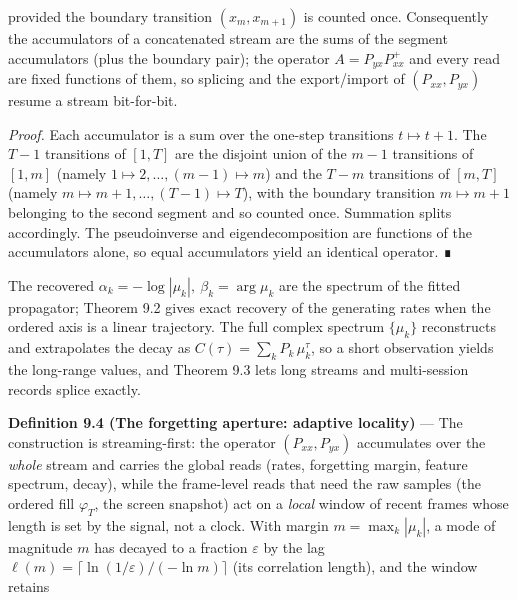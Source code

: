 \documentclass[10pt,letterpaper,twocolumn]{article}
\begin{document}
provided the boundary transition \((x_m,x_{m+1})\) is counted once. Consequently the accumulators of a concatenated stream are the sums of the segment accumulators (plus the boundary pair); the operator \(A=P_{yx}P_{xx}^{+}\) and every read are fixed functions of them, so splicing and the export/import of \((P_{xx},P_{yx})\) resume a stream bit-for-bit.

\emph{Proof.} Each accumulator is a sum over the one-step transitions \(t\mapsto t+1\). The \(T-1\) transitions of \([1,T]\) are the disjoint union of the \(m-1\) transitions of \([1,m]\) (namely \(1\mapsto2,\dots,(m-1)\mapsto m\)) and the \(T-m\) transitions of \([m,T]\) (namely \(m\mapsto m+1,\dots,(T-1)\mapsto T\)), with the boundary transition \(m\mapsto m+1\) belonging to the second segment and so counted once. Summation splits accordingly. The pseudoinverse and eigendecomposition are functions of the accumulators alone, so equal accumulators yield an identical operator. ∎

The recovered \(\alpha_k=-\log|\mu_k|,\ \beta_k=\arg\mu_k\) are the spectrum of the fitted propagator; Theorem 9.2 gives exact recovery of the generating rates when the ordered axis is a linear trajectory. The full complex spectrum \(\{\mu_k\}\) reconstructs and extrapolates the decay as \(C(\tau)=\sum_k P_k\,\mu_k^{\tau}\), so a short observation yields the long-range values, and Theorem 9.3 lets long streams and multi-session records splice exactly.

\textbf{Definition 9.4 (The forgetting aperture: adaptive locality)} --- The construction is streaming-first: the operator \((P_{xx},P_{yx})\) accumulates over the \emph{whole} stream and carries the global reads (rates, forgetting margin, feature spectrum, decay), while the frame-level reads that need the raw samples (the ordered fill \(\varphi_T\), the screen snapshot) act on a \emph{local} window of recent frames whose length is set by the signal, not a clock. With margin \(m=\max_k|\mu_k|\), a mode of magnitude \(m\) has decayed to a fraction \(\varepsilon\) by the lag \(\ell(m)=\lceil\ln(1/\varepsilon)/(-\ln m)\rceil\) (its correlation length), and the window retains

\end{document}
